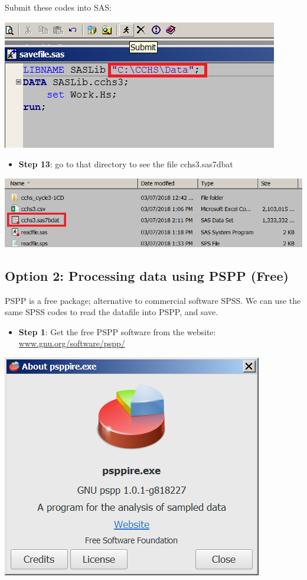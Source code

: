 \documentclass[
]{book}
\providecommand{\tightlist}{%
  \setlength{\itemsep}{0pt}\setlength{\parskip}{0pt}}
\begin{document}
Submit these codes into SAS:

\includegraphics[width=0.65\linewidth]{images/abacus26}

\begin{itemize}
\tightlist
\item
  \textbf{Step 13}: go to that directory to see the file cchs3.sas7dbat
\end{itemize}

\includegraphics[width=0.65\linewidth]{images/abacus27}

\hypertarget{option-2-processing-data-using-pspp-free}{%
\subsection{Option 2: Processing data using PSPP (Free)}\label{option-2-processing-data-using-pspp-free}}

PSPP is a free package; alternative to commercial software SPSS. We can use the same SPSS codes to read the datafile into PSPP, and save.

\begin{itemize}
\tightlist
\item
  \textbf{Step 1}: Get the free PSPP software from the website: \href{http://www.gnu.org/software/pspp/}{www.gnu.org/software/pspp/}
\end{itemize}

\includegraphics[width=0.65\linewidth]{images/abacus30}
\end{document}
